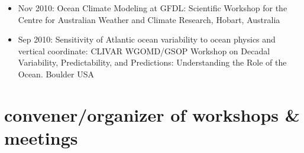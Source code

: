 \documentclass{article}
\begin{document}
\begin{itemize}[leftmargin=*]
\item Nov 2010:  {\sc Ocean Climate Modeling at GFDL}: Scientific
  Workshop for the Centre for Australian Weather and Climate Research,
  Hobart, Australia

\item Sep 2010:  {\sc Sensitivity of Atlantic ocean variability to
    ocean physics and vertical coordinate}: CLIVAR WGOMD/GSOP Workshop
  on Decadal Variability, Predictability, and Predictions:
  Understanding the Role of the Ocean. Boulder USA 




\end{itemize}


\section*{\sc  \color{Maroon}  convener/organizer of workshops \& meetings}
\vspace{-.3cm}
\end{document}
